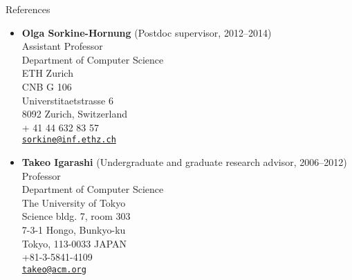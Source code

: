 {\Large\sc References}
\vspace{-3mm}
\begin{itemize}

\item {\bf Olga Sorkine-Hornung} (Postdoc supervisor, 2012--2014) \\
Assistant Professor\\
Department of Computer Science\\
ETH Zurich\\
CNB G 106\\
Universtitaetstrasse 6\\
8092 Zurich, Switzerland\\
+ 41 44 632 83 57\\
\href{mailto:sorkine@inf.ethz.ch}{{\tt sorkine@inf.ethz.ch}}

\item {\bf Takeo Igarashi} (Undergraduate and graduate research advisor, 2006--2012) \\
Professor\\
Department of Computer Science\\
The University of Tokyo\\
Science bldg. 7, room 303\\
7-3-1 Hongo, Bunkyo-ku\\
Tokyo, 113-0033 JAPAN\\
+81-3-5841-4109\\
\href{mailto:takeo@acm.org}{{\tt takeo@acm.org}}

\end{itemize}
